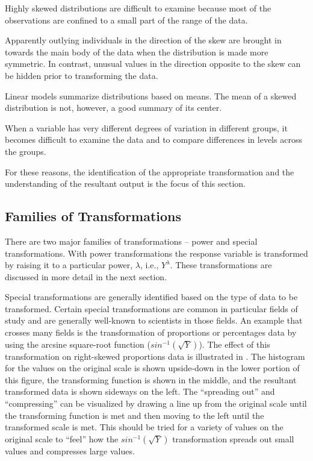 \documentclass[10pt,openany]{book}\usepackage[]{graphicx}\usepackage[]{color}
\begin{document}
\begin{Itemize}
  \item Highly skewed distributions are difficult to examine because most of the observations are confined to a small part of the range of the data.
  \item Apparently outlying individuals in the direction of the skew are brought in towards the main body of the data when the distribution is made more symmetric.  In contrast, unusual values in the direction opposite to the skew can be hidden prior to transforming the data.
  \item Linear models summarize distributions based on means.  The mean of a skewed distribution is not, however, a good summary of its center.
  \item When a variable has very different degrees of variation in different groups, it becomes difficult to examine the data and to compare differences in levels across the groups.
\end{Itemize}

For these reasons, the identification of the appropriate transformation and the understanding of the resultant output is the focus of this section.


\subsection{Families of Transformations}
There are two major families of transformations -- power and special transformations.  With power transformations the response variable is transformed by raising it to a particular power, $\lambda$, i.e., $Y^{\lambda}$.  These transformations are discussed in more detail in the next section.

Special transformations are generally identified based on the type of data to be transformed.  Certain special transformations are common in particular fields of study and are generally well-known to scientists in those fields.  An example that crosses many fields is the transformation of proportions or percentages data by using the arcsine square-root function ($sin^{-1}(\sqrt{Y})$).  The effect of this transformation on right-skewed proportions data is illustrated in .  The histogram for the values on the original scale is shown upside-down in the lower portion of this figure, the transforming function is shown in the middle, and the resultant transformed data is shown sideways on the left.  The ``spreading out'' and ``compressing'' can be visualized by drawing a line up from the original scale until the transforming function is met and then moving to the left until the transformed scale is met.  This should be tried for a variety of values on the original scale to ``feel'' how the $sin^{-1}(\sqrt{Y})$ transformation spreads out small values and compresses large values.
\end{document}
